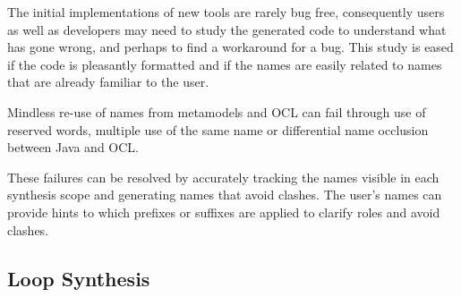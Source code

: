 \documentclass[sigconf]{acmart}
\begin{document}
The initial implementations of new tools are rarely bug free, consequently users as well as developers may need to study the generated code to understand what has gone wrong, and perhaps to find a workaround for a bug. This study is eased if the code is pleasantly formatted and if the names are easily related to names that are already familiar to the user.

Mindless re-use of names from metamodels and OCL can fail through use of reserved words, multiple use of the same name or differential name occlusion between Java and OCL.

These failures can be resolved by accurately tracking the names visible in each synthesis scope and generating names that avoid clashes. The user's names can provide hints to which prefixes or suffixes are applied to clarify roles and avoid clashes.




\subsection{Loop Synthesis}\label{Loop Synthesis}
\end{document}
